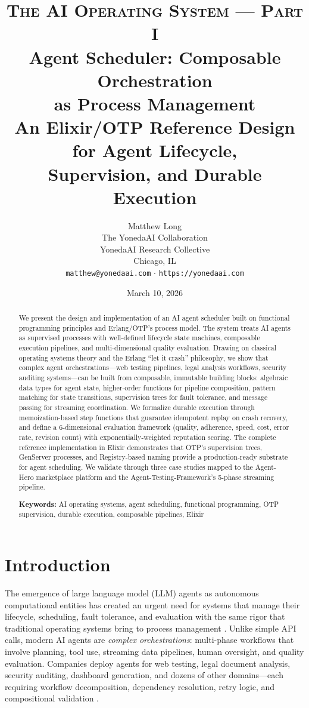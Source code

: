 \documentclass[12pt,a4paper]{article}
\title{
  \vspace{-1cm}
  {\Large\textsc{The AI Operating System --- Part I}} \\[0.5em]
  {\LARGE\textbf{Agent Scheduler: Composable Orchestration\\as Process Management}} \\[0.5em]
  {\large An Elixir/OTP Reference Design for Agent Lifecycle,\\Supervision, and Durable Execution}
}
\author{
  Matthew Long \\
  The YonedaAI Collaboration \\
  YonedaAI Research Collective \\
  Chicago, IL \\
  \texttt{matthew@yonedaai.com} $\cdot$ \texttt{https://yonedaai.com}
}
\date{March 10, 2026}
\theoremstyle{definition}
\theoremstyle{remark}
\begin{document}
\maketitle

\begin{abstract}
We present the design and implementation of an AI agent scheduler built on functional programming principles and Erlang/OTP's process model. The system treats AI agents as supervised processes with well-defined lifecycle state machines, composable execution pipelines, and multi-dimensional quality evaluation. Drawing on classical operating systems theory and the Erlang ``let it crash'' philosophy, we show that complex agent orchestrations---web testing pipelines, legal analysis workflows, security auditing systems---can be built from composable, immutable building blocks: algebraic data types for agent state, higher-order functions for pipeline composition, pattern matching for state transitions, supervision trees for fault tolerance, and message passing for streaming coordination. We formalize durable execution through memoization-based step functions that guarantee idempotent replay on crash recovery, and define a 6-dimensional evaluation framework (quality, adherence, speed, cost, error rate, revision count) with exponentially-weighted reputation scoring. The complete reference implementation in Elixir demonstrates that OTP's supervision trees, GenServer processes, and Registry-based naming provide a production-ready substrate for agent scheduling. We validate through three case studies mapped to the Agent-Hero marketplace platform and the Agent-Testing-Framework's 5-phase streaming pipeline.

\medskip
\noindent\textbf{Keywords:} AI operating systems, agent scheduling, functional programming, OTP supervision, durable execution, composable pipelines, Elixir
\end{abstract}

\tableofcontents
\newpage

\section{Introduction}\label{sec:intro}

The emergence of large language model (LLM) agents as autonomous computational entities has created an urgent need for systems that manage their lifecycle, scheduling, fault tolerance, and evaluation with the same rigor that traditional operating systems bring to process management \citep{wang2024survey,xi2023rise}. Unlike simple API calls, modern AI agents are \emph{complex orchestrations}: multi-phase workflows that involve planning, tool use, streaming data pipelines, human oversight, and quality evaluation. Companies deploy agents for web testing, legal document analysis, security auditing, dashboard generation, and dozens of other domains---each requiring workflow decomposition, dependency resolution, retry logic, and compositional validation \citep{wu2023autogen,hong2024metagpt}.
\end{document}
